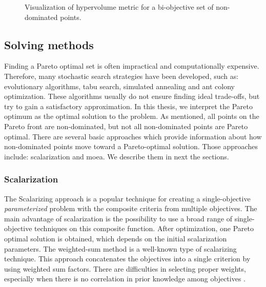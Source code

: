 \begin{figure}
                \caption[Visualization of hypervolume metric for a bi-objective set of non-dominated points]{Visualization of hypervolume metric for a bi-objective set of non-dominated points.}
                \label{fig:hypervolume}    
            \end{figure}
 
        \subsection{Solving methods}
            Finding a Pareto optimal set is often impractical and computationally expensive. Therefore, many stochastic search strategies have been developed, such as: evolutionary algorithms, tabu search, simulated annealing and ant colony optimization. These algorithms usually do not ensure finding ideal trade-offs, but try to gain a satisfactory approximation.
            In this thesis, we interpret the Pareto optimum as the optimal solution to the problem. As mentioned, all points on the Pareto front are non-dominated, but not all non-dominated points are Pareto optimal. There are several basic approaches which provide information about how non-dominated points move toward a Pareto-optimal solution.
            Those approaches include: scalarization and \gls{moea}. We describe them in next the sections.

            \subsubsection{Scalarization}
                The Scalarizing approach is a popular technique for creating a single-objective \textit{parameterized} problem with the composite criteria from multiple objectives. The main advantage of scalarization is the possibility to use a broad range of single-objective techniques on this composite function. After optimization, one Pareto optimal solution is obtained, which depends on the initial scalarization parameters. The weighted-sum method is a well-known type of scalarizing technique. This approach concatenates the objectives into a single criterion by using weighted sum factors. There are difficulties in selecting proper weights, especially when there is no correlation in prior knowledge among objectives \cite{ChughScal2019, DerbelBLV14}. 


